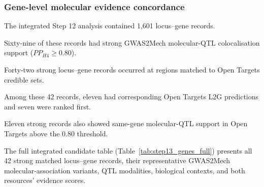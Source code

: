 \documentclass[11pt,a4paper]{article}
\begin{document}
\subsubsection{Gene-level molecular evidence concordance}

The integrated Step 12 analysis contained
1,601 locus--gene records.

Sixty-nine of these records had strong
GWAS2Mech molecular-QTL colocalisation
support ($PP_{H4}\geq0.80$).

Forty-two strong locus--gene records
occurred at regions matched to
Open Targets credible sets.

Among these 42 records, eleven had
corresponding Open Targets L2G predictions
and seven were ranked first.

Eleven strong records also showed
same-gene molecular-QTL support in
Open Targets above the 0.80 threshold.

The full integrated candidate table
(Table~\ref{tab:step13_genes_full})
presents all 42 strong matched
locus--gene records, their representative
GWAS2Mech molecular-association variants,
QTL modalities, biological contexts,
and both resources' evidence scores.
\end{document}
